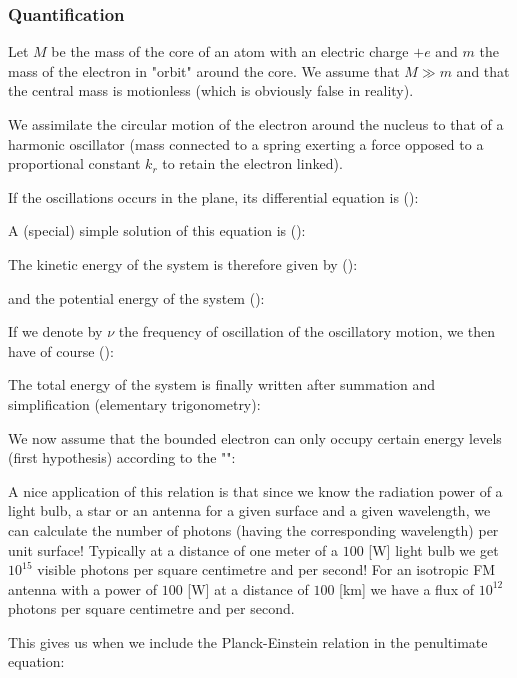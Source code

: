\subsubsection{Quantification}\label{quantification}

Let $M$ be the mass of the core of an atom with an electric charge $+e$ and $m$ the mass of the electron in "orbit" around the core. We assume that $M \gg m$ and that the central mass is motionless (which is obviously false in reality).

We assimilate the circular motion of the electron around the nucleus to that of a harmonic oscillator (mass connected to a spring exerting a force opposed to a proportional constant $k_r$ to retain the  electron linked).

If the oscillations occurs in the plane, its differential equation is ():
	
A (special) simple solution of this equation is ():
	
The kinetic energy of the system is therefore given  by ():
	
and the potential energy of the system ():
	
If we denote by $\nu$ the frequency of oscillation of the oscillatory motion, we then have of course ():
	
The total energy of the system is finally written after summation and simplification (elementary trigonometry):
	
We now assume that the bounded electron can only occupy certain energy levels (first hypothesis) according to the "\label{planck einstein relation}":
	
	\begin{tcolorbox}[title=Remark,colframe=black,arc=10pt]
	A nice application of this relation is that since we know the radiation power of a light bulb, a star or an antenna for a given surface and a given wavelength, we can calculate the number of photons (having the corresponding wavelength) per unit surface! Typically at a distance of one meter of a $100$ [W] light bulb we get $10^{15}$ visible photons per square centimetre and per second! For an isotropic FM antenna with a power of $100$ [W] at a distance of $100$ [km] we have a flux of $10^{12}$ photons per square centimetre and per second.
	\end{tcolorbox}
This gives us when we include the Planck-Einstein relation in the penultimate equation:
	
